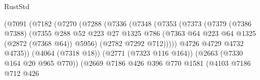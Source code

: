 \begin{lexlean}{RustStd}
\begin{coremodule}
                                        (@7091
                                          (@7182
                                            (@7270
                                              (@7288
                                                (@7336
                                                  (@7348
                                                    (@7353
                                                      (@7373
                                                        (@7379
                                                          (@7386 @7388)
                                                          (@7355
                                                            @288
                                                            @52
                                                            @223
                                                            @27
                                                            @1325
                                                            @786
                                                            (@7363
                                                              @64
                                                              @223
                                                              @64
                                                              @1325
                                                              (@2872 (@7368 @64))
                                                              @5956)
                                                            (@2782 @7292 @712)))))
                                                    @4726
                                                    @4729
                                                    @4732
                                                    @4735))
                                                (@4064 (@7318 @18))
                                                (@2771 (@7323 @116 @164))
                                                (@2663 (@7330 @164 @20 @965 @770))
                                                (@2669
                                                  @7186
                                                  @426
                                                  @396
                                                  @770
                                                  @1581
                                                  (@4103
                                                    @7186
                                                    @712
                                                    @426

\end{coremodule}
\end{lexlean}
